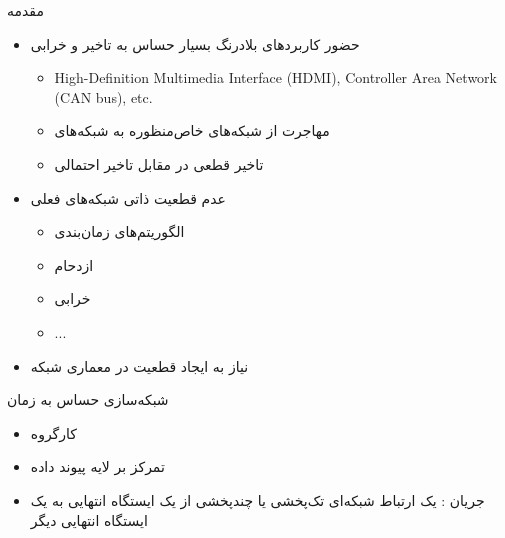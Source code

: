 \documentclass[dvipsnames]{beamer}
\makeatletter
\newcommand{\RTList}{\raggedleft\rightskip\@totalleftmargin}
\makeatother
\begin{document}
\begin{persian}
	\begin{frame}{مقدمه}
		\begin{itemize}\RTList{}
			\justifying%
			\item حضور کاربردهای بلادرنگ بسیار حساس به تاخیر و خرابی
			\begin{itemize}\RTList{}
				\item High-Definition Multimedia Interface (HDMI), Controller Area Network (CAN bus), etc.
			  	\item مهاجرت از شبکه‌های خاص‌منظوره به شبکه‌های 
				\item تاخیر قطعی در مقابل تاخیر احتمالی
			\end{itemize}
			\item عدم قطعیت ذاتی شبکه‌های فعلی
			\begin{itemize}\RTList{}
				\item الگوریتم‌های زمان‌بندی
				\item ازدحام
				\item خرابی
				\item ...
			\end{itemize}
			\item نیاز به ایجاد قطعیت در معماری شبکه
		\end{itemize}
	\end{frame}

	\begin{frame}{شبکه‌‌سازی حساس به زمان }
		\begin{itemize}\RTList{}
			\justifying%
			\item کارگروه 
			\item تمرکز بر لایه پیوند داده
			\item جریان : یک ارتباط شبکه‌ای تک‌پخشی یا چند‌پخشی از یک ایستگاه انتهایی به یک ایستگاه انتهایی دیگر
		\end{itemize}
	\end{frame}


\end{persian}
\end{document}
